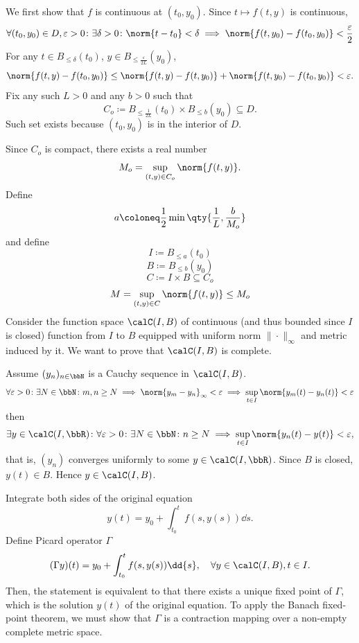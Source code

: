 \documentclass[a4paper,12pt]{report}
\begin{document}
We first show that $f$ is continuous at $(t_0,y_0)$. Since $t\mapsto f(t,y)$ is continuous,
\[\forall (t_0,y_0)\in D,\varepsilon>0\colon\exists\delta>0\colon\norm{t-t_0}<\delta\implies\norm{f(t,y_0)-f(t_0,y_0)}<\frac{\varepsilon}{2}\]
For any $t\in B_{\leq\delta}(t_0)$, $y\in B_{\le\frac{\varepsilon}{2L}}(y_0)$,
\[\norm{f(t,y)-f(t_0,y_0)}\le\norm{f(t,y)-f(t,y_0)}+\norm{f(t,y_0)-f(t_0,y_0)}<\varepsilon.\]
Fix any such $L>0$ and any $b>0$ such that
\[C_o\coloneq B_{\leq\frac{1}{2L}}(t_0)\times B_{\le b}(y_0)\subseteq D.\]
Such set exists because $(t_0,y_0)$ is in the interior of $D$.

Since $C_o$ is compact, there exists a real number
\[M_o=\sup_{(t,y)\in C_o}\norm{f(t,y)}.\]
Define
\[a\coloneq\frac{1}{2}\min\qty{\frac{1}{L},\frac{b}{M_o}}\]
and define
\[I\coloneq B_{\leq a}(t_0)\]
\[B\coloneq B_{\leq b}(y_0)\]
\[C\coloneq I\times B\subseteq C_o\]
\[M=\sup_{(t,y)\in C}\norm{f(t,y)}\le M_o\]
Consider the function space $\calC(I,B)$ of continuous (and thus bounded since $I$ is closed) function from $I$ to $B$ equipped with uniform norm $\|\cdot\|_{\infty}$ and metric induced by it. We want to prove that $\calC(I,B)$ is complete.

Assume $(y_n)_{n\in\bbN}$ is a Cauchy sequence in $\calC(I,B)$.
\[\forall\varepsilon>0\colon\exists N\in\bbN\colon m,n\ge N\implies\norm{y_m-y_n}_{\infty}<\varepsilon\implies\sup_{t\in I}\norm{y_m(t)-y_n(t)}<\varepsilon\]
then
\[\exists y\in\calC(I,\bbR)\colon\forall\varepsilon>0\colon\exists N\in\bbN\colon n\ge N\implies\sup_{t\in I}\norm{y_n(t)-y(t)}<\varepsilon,\]
that is, $(y_n)$ converges uniformly to some $y\in\calC(I,\bbR)$. Since $B$ is closed, $y(t)\in B$. Hence $y\in\calC(I,B)$.

Integrate both sides of the original equation
\[y(t)=y_0+\int_{t_0}^tf(s,y(s))\dd{s}.\]
Define Picard operator $\Gamma$
\[(\Gamma y)(t)=y_0+\int_{t_0}^tf(s,y(s))\dd{s},\quad\forall y\in \calC(I,B),t\in I.\]
Then, the statement is equivalent to that there exists a unique fixed point of $\Gamma$, which is the solution $y(t)$ of the original equation. To apply the Banach fixed-point theorem, we must show that $\Gamma$ is a contraction mapping over a non-empty complete metric space.
\end{document}
